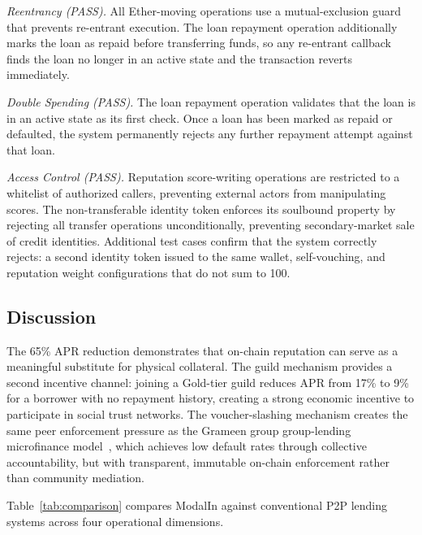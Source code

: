 \documentclass[conference]{IEEEtran}
\begin{document}
\textit{Reentrancy (PASS).} All Ether-moving operations use a
mutual-exclusion guard that prevents re-entrant execution. The loan repayment
operation additionally marks the loan as repaid before transferring funds, so
any re-entrant callback finds the loan no longer in an active state and the
transaction reverts immediately.

\textit{Double Spending (PASS).} The loan repayment operation validates
that the loan is in an active state as its first check. Once a loan has been
marked as repaid or defaulted, the system permanently rejects any further
repayment attempt against that loan.

\textit{Access Control (PASS).} Reputation score-writing operations are
restricted to a whitelist of authorized callers, preventing external actors
from manipulating scores. The non-transferable identity token enforces its
soulbound property by rejecting all transfer operations unconditionally,
preventing secondary-market sale of credit identities. Additional test cases
confirm that the system correctly rejects: a second identity token issued to
the same wallet, self-vouching, and reputation weight configurations that do
not sum to 100.

\subsection{Discussion}

The 65\% APR reduction demonstrates that on-chain reputation can serve as a
meaningful substitute for physical collateral. The guild mechanism provides
a second incentive channel: joining a Gold-tier guild reduces APR from 17\%
to 9\% for a borrower with no repayment history, creating a strong economic
incentive to participate in social trust networks. The voucher-slashing
mechanism creates the same peer enforcement pressure as the Grameen group
group-lending microfinance model~\cite{b13}, which achieves low default
rates through collective accountability, but with transparent, immutable
on-chain enforcement rather than community mediation.

Table~\ref{tab:comparison} compares ModalIn against conventional P2P lending
systems across four operational dimensions.
\end{document}
